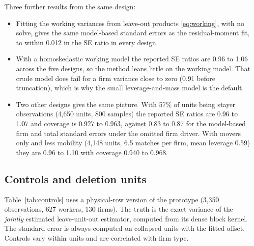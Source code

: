 \documentclass[11pt]{article}
\begin{document}
Three further results from the same design:
\begin{itemize}
\item Fitting the working variances from leave-out products
\eqref{eq:working}, with no solve, gives the same model-based standard
errors as the residual-moment fit, to within 0.012 in the SE ratio in every
design.
\item With a homoskedastic working model the reported SE ratios are 0.96 to
1.06 across the five designs, so the method leans little on the working
model. That crude model does fail for a firm variance close to zero (0.91
before truncation), which is why the small leverage-and-mass model is the
default.
\item Two other designs give the same picture. With 57\% of units being
stayer observations (4,650 units, 800 samples) the reported SE ratios are
0.96 to 1.07 and coverage is 0.927 to 0.963, against 0.83 to 0.87 for the
model-based firm and total standard errors under the omitted firm driver.
With movers only and less mobility (4,148 units, 6.5 matches per firm, mean
leverage 0.59) they are 0.96 to 1.10 with coverage 0.940 to 0.968.
\end{itemize}

\subsection{Controls and deletion units}

Table~\ref{tab:controls} uses a physical-row version of the prototype
(3,350 observations, 627 workers, 130 firms). The truth is the exact variance
of the \emph{jointly} estimated leave-unit-out estimator, computed from its
dense block kernel. The standard error is always computed on collapsed units
with the fitted offset. Controls vary within units and are correlated with
firm type.
\end{document}
